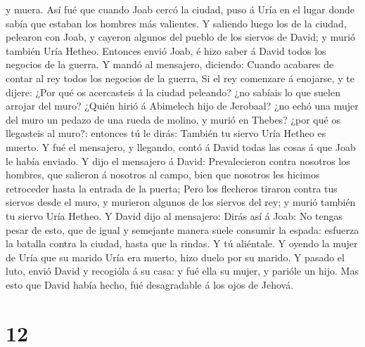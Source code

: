 y muera.  Así fué que cuando Joab cercó la ciudad, puso á
Uría en el lugar donde sabía que estaban los hombres más valientes.
 Y saliendo luego los de la ciudad, pelearon con Joab, y
cayeron algunos del pueblo de los siervos de David; y murió también Uría
Hetheo.  Entonces envió Joab, é hizo saber á David todos
los negocios de la guerra.  Y mandó al mensajero,
diciendo: Cuando acabares de contar al rey todos los negocios de la
guerra,  Si el rey comenzare á enojarse, y te dijere:
¿Por qué os acercasteis á la ciudad peleando? ¿no sabíais lo que suelen
arrojar del muro?  ¿Quién hirió á Abimelech hijo de
Jerobaal? ¿no echó una mujer del muro un pedazo de una rueda de molino,
y murió en Thebes? ¿por qué os llegasteis al muro?: entonces tú le
dirás: También tu siervo Uría Hetheo es muerto.  Y fué el
mensajero, y llegando, contó á David todas las cosas á que Joab le había
enviado.  Y dijo el mensajero á David: Prevalecieron
contra nosotros los hombres, que salieron á nosotros al campo, bien que
nosotros les hicimos retroceder hasta la entrada de la puerta;
 Pero los flecheros tiraron contra tus siervos desde el
muro, y murieron algunos de los siervos del rey; y murió también tu
siervo Uría Hetheo.  Y David dijo al mensajero: Dirás así
á Joab: No tengas pesar de esto, que de igual y semejante manera suele
consumir la espada: esfuerza la batalla contra la ciudad, hasta que la
rindas. Y tú aliéntale.  Y oyendo la mujer de Uría que su
marido Uría era muerto, hizo duelo por su marido.  Y
pasado el luto, envió David y recogióla á su casa: y fué ella su mujer,
y parióle un hijo. Mas esto que David había hecho, fué desagradable á
los ojos de Jehová.

\hypertarget{section-11}{%
\section{12}\label{section-11}}

